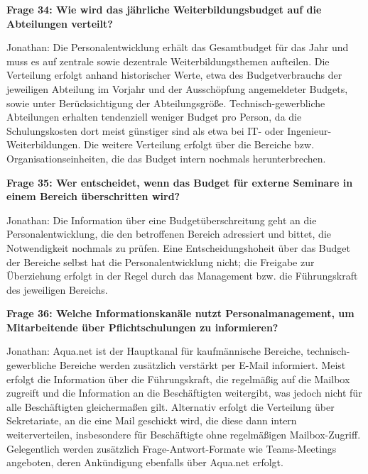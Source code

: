 \documentclass[
    12pt, 
    a4paper,
    ]{scrartcl} %
\begin{document}
\bigskip
{}

\textbf{Frage 34: Wie wird das j\"ahrliche Weiterbildungsbudget auf die Abteilungen verteilt?}

Jonathan: Die Personalentwicklung erh\"alt das Gesamtbudget f\"ur das Jahr und muss es auf zentrale sowie dezentrale Weiterbildungsthemen aufteilen. Die Verteilung erfolgt anhand historischer Werte, etwa des Budgetverbrauchs der jeweiligen Abteilung im Vorjahr und der Aussch\"opfung angemeldeter Budgets, sowie unter Ber\"ucksichtigung der Abteilungsgr\"o{\ss}e. Technisch-gewerbliche Abteilungen erhalten tendenziell weniger Budget pro Person, da die Schulungskosten dort meist g\"unstiger sind als etwa bei IT- oder Ingenieur-Weiterbildungen. Die weitere Verteilung erfolgt \"uber die Bereiche bzw. Organisationseinheiten, die das Budget intern nochmals herunterbrechen.

\medskip
\textbf{Frage 35: Wer entscheidet, wenn das Budget f\"ur externe Seminare in einem Bereich \"uberschritten wird?}

Jonathan: Die Information \"uber eine Budget\"uberschreitung geht an die Personalentwicklung, die den betroffenen Bereich adressiert und bittet, die Notwendigkeit nochmals zu pr\"ufen. Eine Entscheidungshoheit \"uber das Budget der Bereiche selbst hat die Personalentwicklung nicht; die Freigabe zur \"Uberziehung erfolgt in der Regel durch das Management bzw. die F\"uhrungskraft des jeweiligen Bereichs.

\bigskip
{}

\textbf{Frage 36: Welche Informationskan\"ale nutzt Personalmanagement, um Mitarbeitende \"uber Pflichtschulungen zu informieren?}

Jonathan: Aqua.net ist der Hauptkanal f\"ur kaufm\"annische Bereiche, technisch-gewerbliche Bereiche werden zus\"atzlich verst\"arkt per E-Mail informiert. Meist erfolgt die Information \"uber die F\"uhrungskraft, die regelm\"a{\ss}ig auf die Mailbox zugreift und die Information an die Besch\"aftigten weitergibt, was jedoch nicht f\"ur alle Besch\"aftigten gleicherma{\ss}en gilt. Alternativ erfolgt die Verteilung \"uber Sekretariate, an die eine Mail geschickt wird, die diese dann intern weiterverteilen, insbesondere f\"ur Besch\"aftigte ohne regelm\"a{\ss}igen Mailbox-Zugriff. Gelegentlich werden zus\"atzlich Frage-Antwort-Formate wie Teams-Meetings angeboten, deren Ank\"undigung ebenfalls \"uber Aqua.net erfolgt.
\end{document}
